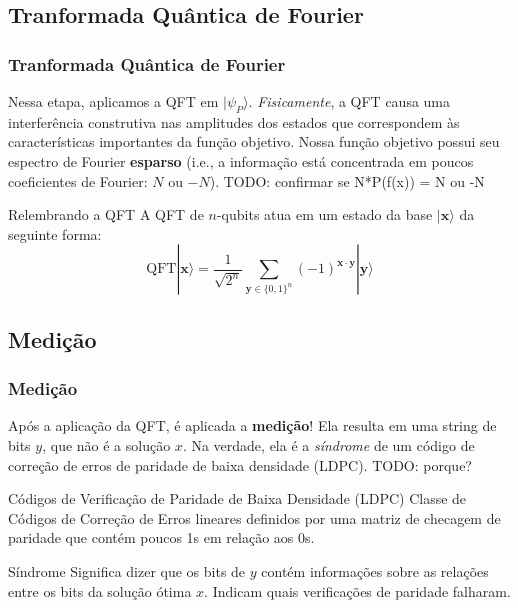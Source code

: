 \documentclass[aspectratio=169]{beamer}
\begin{document}
\subsection{Tranformada Quântica de Fourier}
\begin{frame}
  \frametitle{Tranformada Quântica de Fourier}

  Nessa etapa, aplicamos a QFT em $|\psi_P\rangle$. 
  \vfill
  \textit{Fisicamente}, a QFT causa uma interferência construtiva nas amplitudes dos estados que correspondem às características importantes da função objetivo. 
  Nossa função objetivo possui seu espectro de Fourier \textbf{esparso} (i.e., a informação está concentrada em poucos coeficientes de Fourier: $N$ ou $-N$). TODO: confirmar se N*P(f(x)) = N ou -N
  
  \begin{block}{Relembrando a QFT}
    A QFT de $n$-qubits atua em um estado da base $|\mathbf{x}\rangle$ da seguinte forma:
    $$
    \text{QFT}|\mathbf{x}\rangle = \frac{1}{\sqrt{2^n}} \sum_{\mathbf{y} \in \{0,1\}^n} (-1)^{\mathbf{x} \cdot \mathbf{y}} |\mathbf{y}\rangle
    $$
  \end{block}
\end{frame}

\subsection{Medição}
\begin{frame}
  \frametitle{Medição}

  Após a aplicação da QFT, é aplicada a \textbf{medição}! 
  \vfill
  Ela resulta em uma string de bits $y$, que não é a solução $x$. 
  Na verdade, ela é a \textit{síndrome} de um código de correção de erros de paridade de baixa densidade (LDPC).
  TODO: porque?
  
  \vfill
  \begin{block}{Códigos de Verificação de Paridade de Baixa Densidade (LDPC)}
    Classe de Códigos de Correção de Erros lineares definidos por uma matriz de checagem de paridade que contém poucos 1s em relação aos 0s.
  \end{block}

  \begin{block}{Síndrome}
    Significa dizer que os bits de $y$ contém informações sobre as relações entre os bits da solução ótima $x$. Indicam quais verificações de paridade falharam.
  \end{block}
\end{frame}
\end{document}
